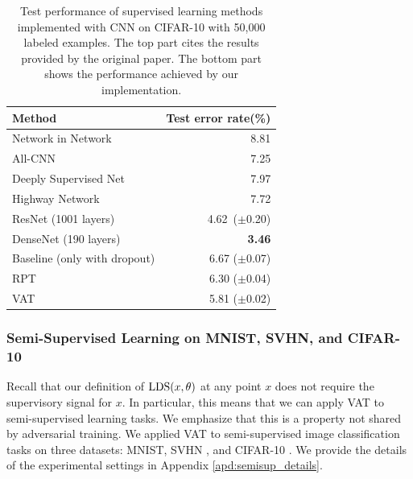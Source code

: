 \documentclass[10pt,journal,compsoc]{IEEEtran}
\begin{document}
\begin{table}[ht]
  \centering
		\caption{\label{tab:supCIFAR-10}Test performance of supervised learning methods implemented with CNN on CIFAR-10 with 50,000 labeled examples.
        The top part cites the results provided by the original paper. 
        The bottom part shows the performance achieved by our implementation.}
		\begin{tabular}{lr}
			\toprule
			Method & Test error rate(\%)  \\
			\midrule
            Network in Network~\cite{lin2013network}  & 8.81 \\
            All-CNN~\cite{springenberg2014striving}  & 7.25 \\
            Deeply Supervised Net~\cite{lee2015deeply}  & 7.97\\
            Highway Network~\cite{srivastava2015highway} & 7.72\\
            ResNet (1001 layers)~\cite{he2016identity}&　4.62~($\pm$0.20)\\
            DenseNet (190 layers)~\cite{huang2016densely} & \textbf{3.46} \\
            \midrule
            Baseline (only with dropout) & 6.67 ($\pm$0.07) \\ %
            RPT & 6.30 ($\pm$0.04) \\ %
            VAT & 5.81 ($\pm$0.02)  \\ %
			\bottomrule
		\end{tabular}
\end{table}

\subsubsection{\label{subsec:semisup}Semi-Supervised Learning on MNIST, SVHN, and CIFAR-10}
Recall that our definition of ${\rm LDS}(x, \theta)$ at any point $x$ does not require the supervisory signal for $x$.
In particular, this means that we can apply VAT to semi-supervised learning tasks. 
We emphasize that this is a property not shared by adversarial training.
We applied VAT to semi-supervised image classification tasks on three datasets: MNIST, SVHN \cite{netzer2011reading}, and CIFAR-10 \cite{krizhevsky2009learning}. 
We provide the details of the experimental settings in Appendix \ref{apd:semisup_details}.
\end{document}
